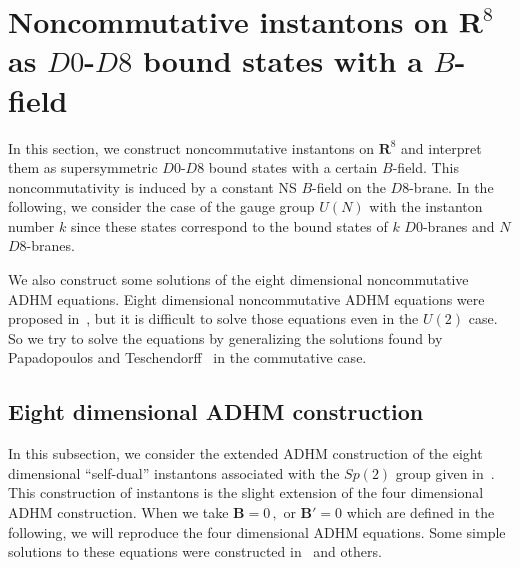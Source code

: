 \documentclass[a4paper,12pt]{article}
\begin{document}



\section{Noncommutative instantons on $\mathbf{R}^8$ 
as $D0$-$D8$ bound states with a $B$-field}

In this section, we construct noncommutative instantons on $\mathbf{R}^8$ 
 and interpret them as supersymmetric $D0$-$D8$ bound states
 with a certain  $B$-field.
This noncommutativity is induced by a constant NS $B$-field 
on the $D8$-brane.
In the following, we consider the case of the gauge group $U(N)$ with 
the instanton number $k$ since these states correspond to the 
bound states of $k$ $D0$-branes and $N$ $D8$-branes.

We also construct some solutions of the eight dimensional 
noncommutative ADHM equations.
Eight dimensional noncommutative ADHM equations were proposed in~\cite{ohta}, 
but it is difficult to solve those equations even in the $U(2)$ case.
So we try to solve the equations 
by generalizing the solutions found by Papadopoulos 
and Teschendorff~\cite{pt, pt2} in the commutative case.


\subsection{Eight dimensional ADHM construction}

In this subsection, we consider the extended ADHM construction of the 
eight dimensional ``self-dual'' instantons associated with the $Sp(2)$ 
group given in~\cite{ward, cgk}.
This construction of instantons is the slight extension of 
the four dimensional ADHM construction.
When we take $\mathbf{B}=0\,,$ or $\mathbf{B}'=0$ which are defined 
in the following, 
we will reproduce the four dimensional ADHM equations. 
Some simple solutions to these equations
 were constructed in~\cite{ns, nekrasov, 
furuuchi, furuuchi2, furuuchi3} and others.
\end{document}
